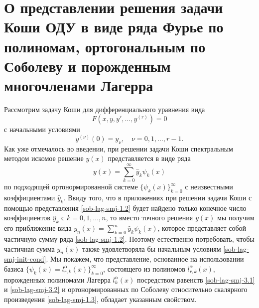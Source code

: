 \section{О представлении решения задачи Коши ОДУ в виде ряда Фурье по полиномам, ортогональным по Соболеву и порожденным многочленами Лагерра}

Рассмотрим задачу Коши для дифференциального уравнения вида
\begin{equation}\label{sob-lag-smj-6.1}
 F(x, y, y', \ldots, y^{(r)}) = 0
\end{equation}
с начальными условиями
\begin{equation}\label{sob-lag-smj-init-cond}
y^{(\nu)}(0)=y_\nu, \quad \nu=0,1,\ldots,r-1.
\end{equation}
Как уже отмечалось во введении, при решении задачи Коши спектральным методом искомое решение $y(x)$ представляется в виде ряда %
\begin{equation}\label{sob-lag-smj-1.2}
y(x)=\sum_{k=0}^\infty \hat{y}_k\psi_k(x)
\end{equation}
по подходящей ортонормированной системе $\{\psi_k(x)\}_{k=0}^\infty$ с неизвестными коэффициентами $\hat{y}_k$. Ввиду того, что в приложениях при решении задачи Коши с помощью представления \eqref{sob-lag-smj-1.2} будет найдено только конечное число коэффициентов $\hat{y}_k$ с $k=0,1,\ldots, n$, то вместо точного решения $y(x)$ мы получим его приближение вида $y_n(x)=\sum_{k=0}^n \hat{y}_k\psi_k(x)$, которое представляет собой частичную сумму ряда \eqref{sob-lag-smj-1.2}. Поэтому естественно потребовать, чтобы частичная сумма $y_n(x)$ также удовлетворяла бы начальным условиям \eqref{sob-lag-smj-init-cond}.
Мы покажем, что представление, основанное на использовании базиса $\{\psi_k(x)=l_{r,k}^\alpha(x)\}_{k=0}^\infty$, состоящего из полиномов $l_{r,k}^\alpha(x)$, порожденных полиномами Лагерра $l_{k}^\alpha(x)$ посредством равенств \eqref{sob-lag-smj-3.1} и \eqref{sob-lag-smj-3.2} и ортонормированных по Соболеву относительно скалярного произведения \eqref{sob-lag-smj-1.3}, обладает указанным свойством.


